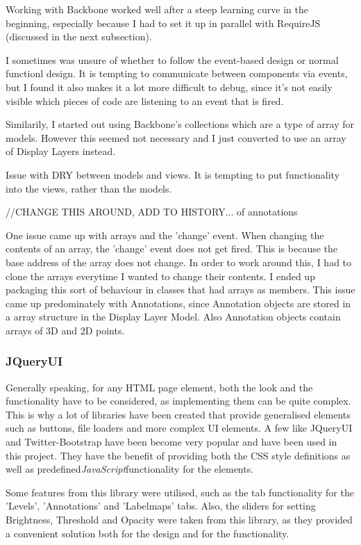 \documentclass[a4paper,11pt,twoside]{article}
\begin{document}
Working with Backbone worked well after a steep learning curve in the beginning, especially because I had to set it up in parallel with RequireJS (discussed in the next subsection).

I sometimes was unsure of whether to follow the event-based design or normal functionl design. It is tempting to communicate between components via events, but I found it also makes it a lot more difficult to debug, since it's not easily visible which pieces of code are listening to an event that is fired.

Similarily, I started out using Backbone's collections which are a type of array for models. However this seemed not necessary and I just converted to use an array of Display Layers instead.

Issue with DRY between models and views. It is tempting to put functionality into the views, rather than the models.

//CHANGE THIS AROUND, ADD TO HISTORY... of annotations

One issue came up with arrays and the 'change' event. When changing the contents of an array, the 'change' event does not get fired. This is because the base address of the array does not change. In order to work around this, I had to clone the arrays everytime I wanted to change their contents. I ended up packaging this sort of behaviour in classes that had arrays as members. This issue came up predominately with Annotations, since Annotation objects are stored in a array structure in the Display Layer Model. Also Annotation objects contain arrays of 3D and 2D points.






\subsubsection{JQueryUI}

Generally speaking, for any HTML page element, both the look and the functionality have to be considered, as implementing them can be quite complex. This is why a lot of libraries have been created that provide generalised elements such as buttons, file loaders and more complex UI elements. A few like JQueryUI and Twitter-Bootstrap have been become very popular and have been used in this project. They have the benefit of providing both the CSS style definitions as well as predefined\textit{JavaScript}functionality for the elements. 

Some features from this library were utilised, such as the tab functionality for the 'Levels', 'Annotations' and 'Labelmaps' tabs. Also, the sliders for setting Brightness, Threshold and Opacity were taken from this library, as they provided a convenient solution both for the design and for the functionality.
\end{document}

